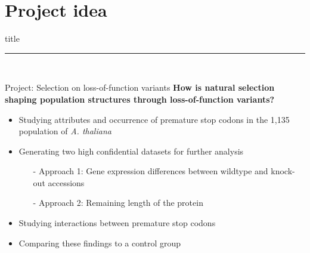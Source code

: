 \documentclass{beamer}
\begin{document}
\section{Project idea}
\begin{frame}[plain]
    \vfill
    \centering
    \begin{beamercolorbox}[sep=8pt,center,shadow=true,rounded=true]{title}
      \insertsectionhead\par%
      \noindent\rule{10cm}{1pt} \\
    \end{beamercolorbox}
    \vfill
\end{frame}
\begin{frame}{Project: Selection on loss-of-function variants}
	\textbf{How is natural selection shaping population structures through loss-of-function variants?}

	\vspace{3mm}
	\begin{itemize}
		\item Studying attributes and occurrence of premature stop codons in the 1,135 population of \textit{A. thaliana} 
		\item Generating two high confidential datasets for further analysis
		\begin{itemize}
			\item[-] Approach 1: Gene expression differences between wildtype and knock-out accessions 
			\item[-] Approach 2: Remaining length of the protein 
		\end{itemize}
		\item Studying interactions between premature stop codons
		\item Comparing these findings to a control group
	\end{itemize}
\end{frame}
\end{document}
